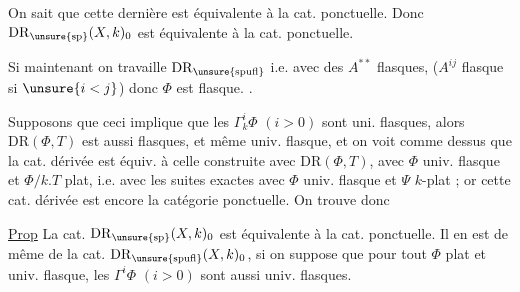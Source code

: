 On sait que cette dernière est équivalente à la cat. ponctuelle. Donc $\mathrm{DR}_{\unsure{\mathrm{sp}}}(X,k)_0$ est équivalente à la cat. ponctuelle.

Si maintenant on travaille  $\mathrm{DR}_{\unsure{\mathrm{spufl}}}$  i.e. avec des $A^{**}$  flasques, ($A^{ij}$  flasque si $\unsure{i<j}$) donc $\Phi$ est  flasque.
.

Supposons que ceci implique que les $\Gamma_k^i\Phi$ $(i>0)$ sont uni. flasques, alors $\mathrm{DR}(\Phi,T)$ est aussi flasques,  et même univ. flasque, et on voit comme dessus que la cat. dérivée est équiv. à celle construite avec  $\mathrm{DR}(\Phi,T)$, avec $\Phi$ univ. flasque et $\Phi/k.T$ plat, i.e. avec les suites exactes
avec $\Phi$ univ. flasque et $\Psi$ $k$-plat ; or cette cat. dérivée est encore la catégorie ponctuelle. On trouve donc

\uline{Prop} La cat. $\mathrm{DR}_{\unsure{\mathrm{sp}}}(X,k)_0$ est équivalente à la cat. ponctuelle. Il en est de même de la cat. $\mathrm{DR}_{\unsure{\mathrm{spufl}}}(X,k)_0$, si on suppose que pour tout  $\Phi$ plat et univ. flasque, les $\Gamma^i\Phi$ $(i>0)$ sont aussi univ. flasques.

